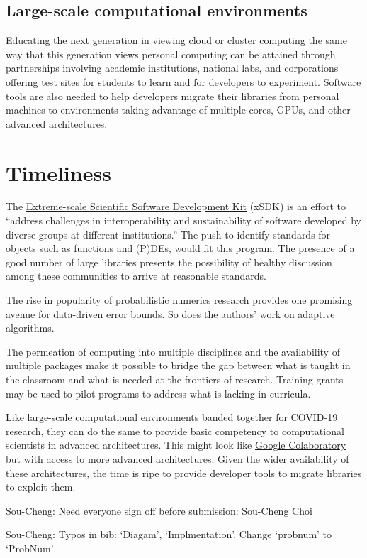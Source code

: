 \documentclass{amsart}
\newcommand{\SCTCNote}[1]{{\color{green}Sou-Cheng: #1}}
\begin{document}
\subsection{Large-scale computational environments}  
Educating the next generation in viewing cloud or cluster computing the same way that this generation views personal computing can be attained through partnerships involving academic institutions, national labs, and corporations offering test sites for students to learn and for developers to experiment.  Software tools are also needed to help developers migrate their libraries from personal machines to environments taking advantage of multiple cores, GPUs, and other advanced architectures.  



\section{Timeliness} %

The \href{https://xsdk.info}{Extreme-scale Scientific Software Development Kit} (xSDK) is an effort to ``address challenges in interoperability and sustainability of software developed by diverse groups at different institutions.'' The push to identify standards for objects such as functions and (P)DEs, would fit this program. The presence of a good number of large libraries presents the possibility of healthy discussion among these communities to arrive at reasonable standards.

The rise in popularity of probabilistic numerics research provides one promising avenue for data-driven error bounds.  So does the authors' work on adaptive algorithms.

The permeation of computing into multiple disciplines and the availability of multiple packages make it possible to bridge the gap between what is taught in the classroom and what is needed at the frontiers of research.  Training grants may be used to pilot programs to address what is lacking in curricula.

Like large-scale computational environments banded together for COVID-19 research, they can do the same to provide basic competency to computational scientists in advanced architectures.  This might look like \href{https://colab.research.google.com}{Google Colaboratory} but with access to more advanced architectures.  Given the wider availability of these architectures, the time is ripe to provide developer tools to migrate libraries to exploit them.

\printbibliography
%
%

\vspace{-1ex}

\SCTCNote{Need everyone sign off before submission: Sou-Cheng Choi}

\SCTCNote{Typos in bib: `Diagam', `Implmentation'. Change `probnum' to `ProbNum'}
\end{document}
